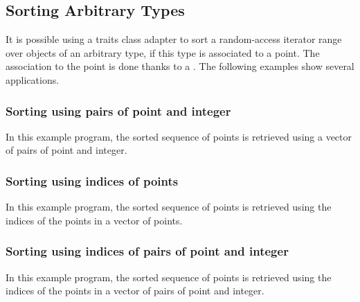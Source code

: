 
\subsection{Sorting Arbitrary Types}
\label{sec:sort_any_type}
It is possible using a traits class adapter to sort a random-access
iterator range over objects of an arbitrary type, if this type is associated
to a point. The association to the point is done thanks to a 
.
The following examples show several applications.

\subsubsection{Sorting using pairs of point and integer}
\label{sec:sort_any_type_2}
In this example program, the sorted sequence of points is retrieved 
using a vector of pairs of point and integer.

\subsubsection{Sorting using indices of points}
In this example program, the sorted sequence of points is retrieved 
using the indices of the points in a vector of points.

\subsubsection{Sorting using indices of pairs of point and integer}
In this example program, the sorted sequence of points is retrieved 
using the indices of the points in a vector of pairs of point and integer.



